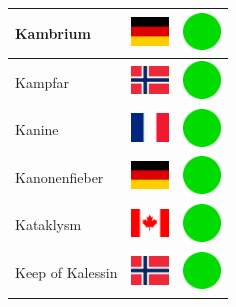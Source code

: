 \documentclass[12pt, a4paper, twoside]{report}
\begin{document}
\begin{center}
\begin{longtable}{|p{5cm}|p{2cm}|p{2cm}|}
 Kambrium                                                   & \includegraphics[width=1cm]{../4x3/de} &   \includegraphics[width=1cm]{../likes/y} \\ \hline
 Kampfar                                                    & \includegraphics[width=1cm]{../4x3/no} &   \includegraphics[width=1cm]{../likes/y} \\ \hline
 Kanine                                                     & \includegraphics[width=1cm]{../4x3/fr} &   \includegraphics[width=1cm]{../likes/y} \\ \hline
 Kanonenfieber                                              & \includegraphics[width=1cm]{../4x3/de} &   \includegraphics[width=1cm]{../likes/y} \\ \hline
 Kataklysm                                                  & \includegraphics[width=1cm]{../4x3/ca} &   \includegraphics[width=1cm]{../likes/y} \\ \hline
 Keep of Kalessin                                           & \includegraphics[width=1cm]{../4x3/no} &   \includegraphics[width=1cm]{../likes/y} \\ \hline

\end{longtable}
\end{center}
\end{document}
